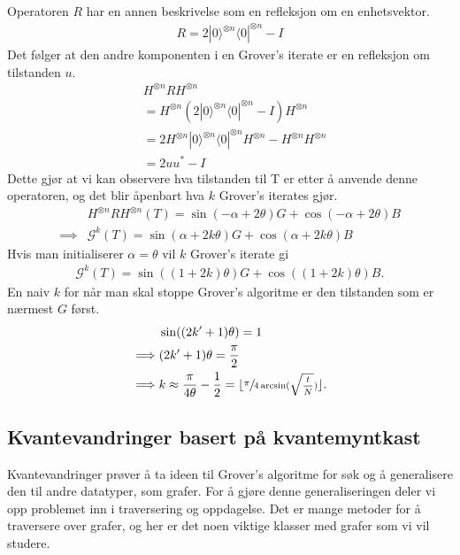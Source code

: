     Operatoren $R$ har en annen beskrivelse som en refleksjon om en enhetsvektor.
    \begin{align*}
        R = 2|0\rangle^{\otimes n}\langle0|^{\otimes n} - I
    \end{align*}
    Det følger at den andre komponenten i en Grover's iterate er en refleksjon om tilstanden $u$.
    \begin{align*}
        & H^{\otimes n}RH^{\otimes n} \\ 
        & = H^{\otimes n}(2|0\rangle^{\otimes n}\langle0|^{\otimes n} -I)H^{\otimes n} \\ 
        & = 2H^{\otimes n}|0\rangle^{\otimes n}\langle0|^{\otimes n}H^{\otimes n} - H^{\otimes n}H^{\otimes n} \\ 
        & = 2uu^* - I
    \end{align*}
    Dette gjør at vi kan observere hva tilstanden til T er etter å anvende denne operatoren, og det blir åpenbart hva $k$ Grover's iterates gjør.
    \begin{align*}
        & H^{\otimes n}RH^{\otimes n}(T)=\sin(-\alpha + 2\theta)G+\cos(-\alpha + 2\theta)B \\
        \implies & \mathcal{G}^k(T)=\sin(\alpha+2k\theta)G+\cos(\alpha+2k\theta)B
    \end{align*} 
    Hvis man initialiserer $\alpha = \theta$ vil $k$ Grover's iterate gi
    \begin{align*}
        \mathcal{G}^k(T)=\sin((1+2k)\theta)G+\cos((1+2k)\theta)B.
    \end{align*}
    En naiv $k$ for når man skal stoppe Grover's algoritme er den tilstanden som er nærmest $G$ først.
    \begin{align*}
        & \sin((2k'+1)\theta) =1 \\
        \implies & (2k'+1)\theta = \frac{\pi}{2} \\
        \implies & k \approx \frac{\pi}{4\theta} - \frac{1}{2}=\lfloor\sfrac{\pi}{4\arcsin(\sqrt{\frac{t}{N}})}\rfloor.
    \end{align*}

        
\subsection{Kvantevandringer basert på kvantemyntkast}

    Kvantevandringer prøver å ta ideen til Grover's algoritme for søk og å generalisere den til andre datatyper, som grafer. For å gjøre denne generaliseringen deler vi opp problemet inn i traversering og oppdagelse. Det er mange metoder for å traversere over grafer, og her er det noen viktige klasser med grafer som vi vil studere.

